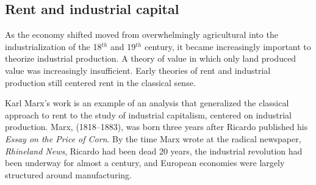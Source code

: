 \subsection{Rent and industrial capital} \label{section-rent-and-industrial-capital}
As the economy shifted  moved from overwhelmingly agricultural into the industrialization of the 18$^{th}$  and 19$^{th}$ century, it became increasingly important to theorize industrial production. A theory of value in which only land produced value was increasingly insufficient. 
Early theories of rent and industrial production still centered rent in the classical sense. 

Karl Marx's work is an example of an analysis that generalized the classical approach to rent to the study of industrial capitalism, centered on industrial production. %
Marx, (1818--1883), was born three years after Ricardo published his \textit{Essay on the Price of Corn}. By the time Marx wrote %
at the radical newspaper, \textit{Rhineland News}, Ricardo had been dead 20 years, the industrial revolution had been underway for almost a century, and European economies were largely structured around manufacturing. 

